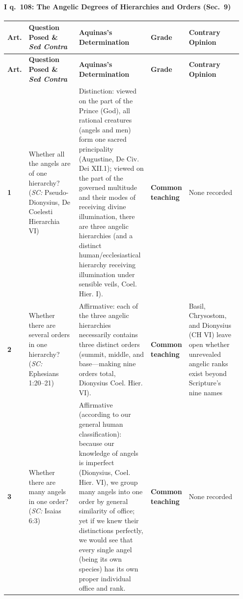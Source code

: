 \paragraph{I q.~108: The Angelic Degrees of Hierarchies and Orders (Sec.~9)}
{\scriptsize
\setlength{\tabcolsep}{2.5pt}
\renewcommand{\arraystretch}{1.15}
\begin{longtable}{>{\raggedright\arraybackslash}p{0.05\linewidth}>{\raggedright\arraybackslash}p{0.23\linewidth}>{\raggedright\arraybackslash}p{0.31\linewidth}>{\raggedright\arraybackslash}p{0.12\linewidth}>{\raggedright\arraybackslash}p{0.24\linewidth}}
\toprule
\textbf{Art.} & \textbf{Question Posed \& \emph{Sed Contra}} & \textbf{Aquinas's Determination} & \textbf{Grade} & \textbf{Contrary Opinion} \\
\midrule
\endfirsthead
\toprule
\textbf{Art.} & \textbf{Question Posed \& \emph{Sed Contra}} & \textbf{Aquinas's Determination} & \textbf{Grade} & \textbf{Contrary Opinion} \\
\midrule
\endhead
\bottomrule
\endfoot
\textbf{1} & Whether all the angels are of one hierarchy? (\emph{SC:} Pseudo-Dionysius, De Coelesti Hierarchia VI) & Distinction: viewed on the part of the Prince (God), all rational creatures (angels and men) form one sacred principality (Augustine, De Civ. Dei XII.1); viewed on the part of the governed multitude and their modes of receiving divine illumination, there are three angelic hierarchies (and a distinct human/ecclesiastical hierarchy receiving illumination under sensible veils, Coel. Hier. I). & \textbf{Common teaching} & None recorded \\
\addlinespace[1.5pt]
\textbf{2} & Whether there are several orders in one hierarchy? (\emph{SC:} Ephesians 1:20--21) & Affirmative: each of the three angelic hierarchies necessarily contains three distinct orders (summit, middle, and base---making nine orders total, Dionysius Coel. Hier. VI). & \textbf{Common teaching} & Basil, Chrysostom, and Dionysius (CH VI) leave open whether unrevealed angelic ranks exist beyond Scripture's nine names \\
\addlinespace[1.5pt]
\textbf{3} & Whether there are many angels in one order? (\emph{SC:} Isaias 6:3) & Affirmative (according to our general human classification): because our knowledge of angels is imperfect (Dionysius, Coel. Hier. VI), we group many angels into one order by general similarity of office; yet if we knew their distinctions perfectly, we would see that every single angel (being its own species) has its own proper individual office and rank. & \textbf{Common teaching} & None recorded \\

\end{longtable}}

